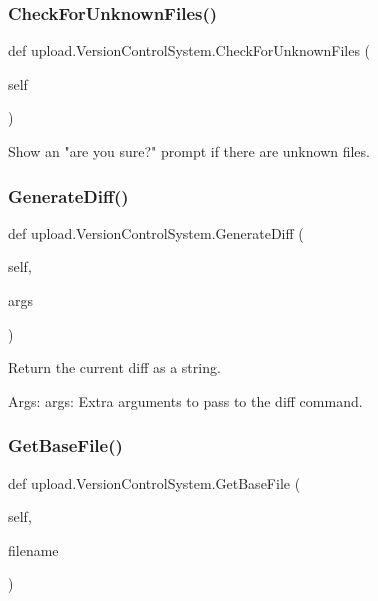 \subsubsection{\texorpdfstring{Check\+For\+Unknown\+Files()}{CheckForUnknownFiles()}}
{\footnotesize\ttfamily def upload.\+Version\+Control\+System.\+Check\+For\+Unknown\+Files (\begin{DoxyParamCaption}\item[{}]{self }\end{DoxyParamCaption})}

\begin{DoxyVerb}Show an "are you sure?" prompt if there are unknown files.\end{DoxyVerb}
 \mbox{\label{classupload_1_1_version_control_system_aa5eb260c96e7016dab36b5fc136c9f49}} 
\subsubsection{\texorpdfstring{Generate\+Diff()}{GenerateDiff()}}
{\footnotesize\ttfamily def upload.\+Version\+Control\+System.\+Generate\+Diff (\begin{DoxyParamCaption}\item[{}]{self,  }\item[{}]{args }\end{DoxyParamCaption})}

\begin{DoxyVerb}Return the current diff as a string.

Args:
  args: Extra arguments to pass to the diff command.
\end{DoxyVerb}
 \mbox{\label{classupload_1_1_version_control_system_adfd9d4ecba422102233a2ba13e5bfaf5}} 
\subsubsection{\texorpdfstring{Get\+Base\+File()}{GetBaseFile()}}
{\footnotesize\ttfamily def upload.\+Version\+Control\+System.\+Get\+Base\+File (\begin{DoxyParamCaption}\item[{}]{self,  }\item[{}]{filename }\end{DoxyParamCaption})}

